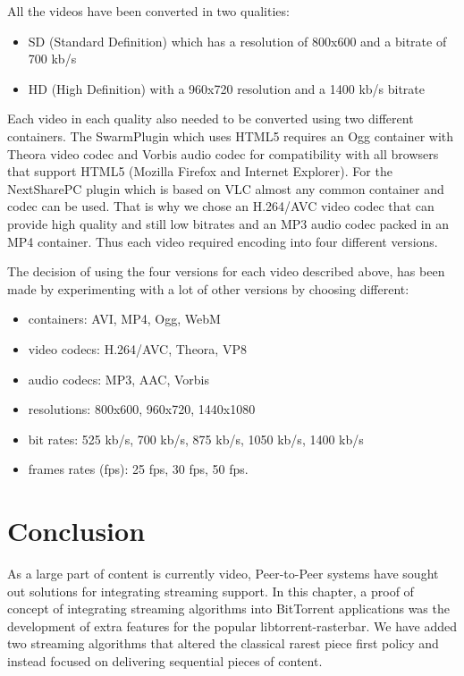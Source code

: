 All the videos have been converted in two qualities: 
\begin{itemize}
  \item SD (Standard Definition) which has a resolution of 800x600 and a
  bitrate of 700 kb/s
  \item HD (High Definition) with a 960x720 resolution and a 1400 kb/s bitrate
\end{itemize}

Each video in each quality also needed to be converted using two different
containers. The SwarmPlugin which uses HTML5 requires an Ogg container with
Theora video codec and Vorbis audio codec for compatibility with all browsers
that support HTML5 (Mozilla Firefox and Internet Explorer). For the
NextSharePC plugin which is based on VLC almost any common container and codec
can be used. That is why we chose an H.264/AVC video codec that can provide
high quality and still low bitrates and an MP3 audio codec packed in an MP4
container. Thus each video required encoding into four different versions.

The decision of using the four versions for each video described above, has
been made by experimenting with a lot of other versions by choosing different:
\begin{itemize}
  \item containers: AVI, MP4, Ogg, WebM
  \item video codecs: H.264/AVC, Theora, VP8
  \item audio codecs: MP3, AAC, Vorbis
  \item resolutions: 800x600, 960x720, 1440x1080
  \item bit rates: 525 kb/s, 700 kb/s, 875 kb/s, 1050 kb/s, 1400 kb/s
  \item frames rates (fps): 25 fps, 30 fps, 50 fps.
\end{itemize}

\section{Conclusion}
\label{sec:multimedia-dist:conclusion}

As a large part of content is currently video, Peer-to-Peer systems have
sought out solutions for integrating streaming support. In this chapter, a
proof of concept of integrating streaming algorithms into BitTorrent
applications was the development of extra features for the popular
libtorrent-rasterbar. We have added two streaming algorithms that altered the
classical rarest piece first policy and instead focused on delivering
sequential pieces of content.

